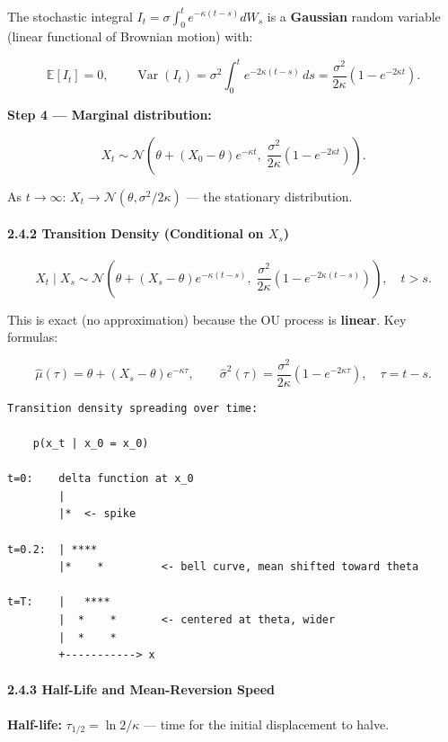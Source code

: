 \documentclass[11pt,a4paper]{article}
\begin{document}
The stochastic integral \(I_t = \sigma\int_0^t e^{-\kappa(t-s)}dW_s\) is a \textbf{Gaussian} random variable (linear functional of Brownian motion) with:

\[\mathbb{E}[I_t] = 0, \qquad \operatorname{Var}(I_t) = \sigma^2\int_0^t e^{-2\kappa(t-s)}\,ds = \frac{\sigma^2}{2\kappa}(1-e^{-2\kappa t}).\]

\textbf{Step 4 --- Marginal distribution:}

\[X_t \sim \mathcal{N}\!\left(\theta + (X_0-\theta)e^{-\kappa t},\;\frac{\sigma^2}{2\kappa}(1-e^{-2\kappa t})\right).\]

As \(t\to\infty\): \(X_t \to \mathcal{N}(\theta, \sigma^2/2\kappa)\) --- the stationary distribution.

\paragraph{\texorpdfstring{2.4.2 Transition Density (Conditional on \(X_s\))}{2.4.2 Transition Density (Conditional on X\_s)}}\label{transition-density-conditional-on-x_s}

\[X_t \mid X_s \sim \mathcal{N}\!\left(\theta + (X_s-\theta)e^{-\kappa(t-s)},\;\frac{\sigma^2}{2\kappa}(1-e^{-2\kappa(t-s)})\right), \quad t > s.\]

This is exact (no approximation) because the OU process is \textbf{linear}. Key formulas:

\[\hat\mu(\tau) = \theta + (X_s-\theta)e^{-\kappa\tau}, \qquad \hat\sigma^2(\tau) = \frac{\sigma^2}{2\kappa}(1-e^{-2\kappa\tau}), \quad \tau=t-s.\]

\begin{verbatim}
Transition density spreading over time:

    p(x_t | x_0 = x_0)

t=0:    delta function at x_0
        |
        |*  <- spike

t=0.2:  | **** 
        |*    *         <- bell curve, mean shifted toward theta

t=T:    |   ****
        |  *    *       <- centered at theta, wider
        |  *    *
        +-----------> x
\end{verbatim}

\paragraph{2.4.3 Half-Life and Mean-Reversion Speed}\label{half-life-and-mean-reversion-speed}

\textbf{Half-life:} \(\tau_{1/2} = \ln 2/\kappa\) --- time for the initial displacement to halve.
\end{document}
